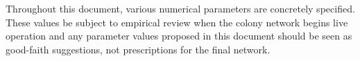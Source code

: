 Throughout this document, various numerical parameters are concretely specified. These values be subject to empirical review when the colony network begins live operation and any parameter values proposed in this document should be seen as good-faith suggestions, not prescriptions for the final network.
